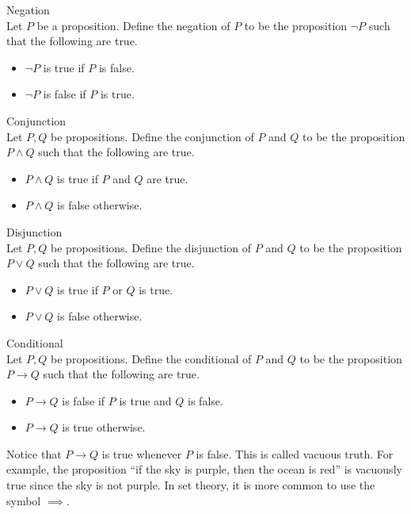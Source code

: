 \documentclass[a4paper]{article}
\begin{document}
\begin{defn}{Negation}{}\\
Let $P$ be a proposition. Define the negation of $P$ to be the proposition $\neg P$ such that the following are true. 
\begin{itemize}
\item $\neg P$ is true if $P$ is false. 
\item $\neg P$ is false if $P$ is true. 
\end{itemize}
\end{defn}

\begin{defn}{Conjunction}{}\\
Let $P,Q$ be propositions. Define the conjunction of $P$ and $Q$ to be the proposition $P\wedge Q$ such that the following are true. 
\begin{itemize}
\item $P\wedge Q$ is true if $P$ and $Q$ are true. 
\item $P\wedge Q$ is false otherwise. 
\end{itemize}
\end{defn}

\begin{defn}{Disjunction}{}\\
Let $P,Q$ be propositions. Define the disjunction of $P$ and $Q$ to be the proposition $P\vee Q$ such that the following are true. 
\begin{itemize}
\item $P\vee Q$ is true if $P$ or $Q$ is true. 
\item $P\vee Q$ is false otherwise. 
\end{itemize}
\end{defn}

\begin{defn}{Conditional}{}\\
Let $P,Q$ be propositions. Define the conditional of $P$ and $Q$ to be the proposition $P\to Q$ such that the following are true. 
\begin{itemize}
\item $P\to Q$ is false if $P$ is true and $Q$ is false. 
\item $P\to Q$ is true otherwise. 
\end{itemize}
\end{defn}

Notice that $P\to Q$ is true whenever $P$ is false. This is called vacuous truth. For example, the proposition ``if the sky is purple, then the ocean is red'' is vacuously true since the sky is not purple. In set theory, it is more common to use the symbol $\implies$. 
\end{document}
